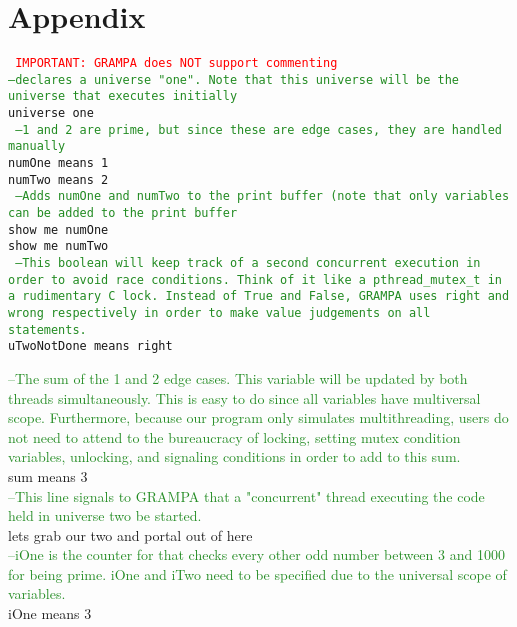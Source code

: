 \documentclass[preprint]{sigplanconf}
\begin{document}
\onecolumn
\appendix
\section{Appendix}
{\tt
\textcolor{red}{IMPORTANT: GRAMPA does NOT support commenting}\\
\textcolor{ForestGreen}{--declares a universe "one". Note that this universe will be the universe that executes initially}\\ universe one \\

\textcolor{ForestGreen}{  --1 and 2 are prime, but since these are edge cases, they are handled manually}\\
\indent numOne means 1\\
\indent numTwo means 2\\

\textcolor{ForestGreen}{  --Adds numOne and numTwo to the print buffer (note that only variables can be added to the print buffer}\\
\indent show me numOne\\
\indent show me numTwo\\

\textcolor{ForestGreen}{  --This boolean will keep track of a second concurrent execution in order to avoid race conditions. Think of it like a pthread\_mutex\_t in a rudimentary C lock. Instead of True and False, GRAMPA uses right and wrong respectively in order to make value judgements on all statements.}\\
\indent uTwoNotDone means right

\textcolor{ForestGreen}{  --The sum of the 1 and 2 edge cases. This variable will be updated by both threads simultaneously. This is easy to do since all variables have multiversal scope. Furthermore, because our program only simulates multithreading, users do not need to attend to the bureaucracy of locking, setting mutex condition variables, unlocking, and signaling conditions in order to add to this sum.}\\
\indent sum means 3\\

\textcolor{ForestGreen}{  --This line signals to GRAMPA that a "concurrent" thread executing the code held in universe two be started.} \\
\indent lets grab our two and portal out of here \\

\textcolor{ForestGreen}{  --iOne is the counter for that checks every other odd number between 3 and 1000 for being prime. iOne and iTwo need to be specified due to the universal scope of variables.} \\
\indent iOne means 3 \\

}
\end{document}
